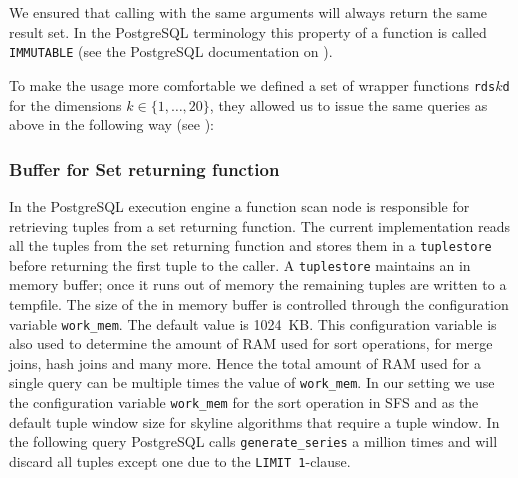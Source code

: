 We ensured that calling  with the same
arguments will always return the same result set. In the PostgreSQL
terminology this property of a function is called \texttt{IMMUTABLE}
(see the PostgreSQL documentation on
).

To make the usage more comfortable we defined a set of wrapper
functions \texttt{rds$k$d} for the dimensions $k \in \{1, \ldots,
20\}$, they allowed us to issue the same queries as above in the
following way (see ):

\begin{interactive}
\ellipsis{}

\ellipsis{}

\ellipsis{}
\end{interactive}


\subsubsection{Buffer for Set returning function}

In the PostgreSQL execution engine a function scan node is responsible
for retrieving tuples from a set returning function. The current
implementation reads all the tuples from the set returning function
and stores them in a \texttt{tuplestore} before returning the first
tuple to the caller. A \texttt{tuplestore} maintains an in memory
buffer; once it runs out of memory the remaining tuples are written to
a tempfile. The size of the in memory buffer is controlled through the
configuration variable \texttt{work\_mem}. The default value is
1024~KB. This configuration variable is also used to determine the amount
of RAM used for sort operations, for merge joins, hash joins and many more.
Hence the total amount of RAM used for a single query can be multiple
times the value of \texttt{work\_mem}.
In our setting we use the configuration variable \texttt{work\_mem}
for the sort operation in SFS and as the default tuple window size for
skyline algorithms that require a tuple window. In the following query
PostgreSQL calls \texttt{generate\_series} a million times and will
discard all tuples except one due to the
\texttt{LIMIT 1}-clause.

